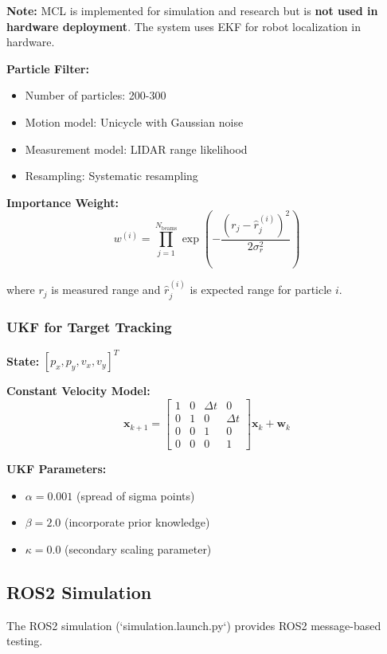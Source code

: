 \documentclass[11pt]{article}
\begin{document}
\textbf{Note:} MCL is implemented for simulation and research but is \textbf{not used in hardware deployment}. The system uses EKF for robot localization in hardware.

\textbf{Particle Filter:}
\begin{itemize}
    \item Number of particles: 200-300
    \item Motion model: Unicycle with Gaussian noise
    \item Measurement model: LIDAR range likelihood
    \item Resampling: Systematic resampling
\end{itemize}

\textbf{Importance Weight:}
\[
w^{(i)} = \prod_{j=1}^{N_{\text{beams}}} \exp\left(-\frac{(r_j - \hat{r}_j^{(i)})^2}{2\sigma_r^2}\right)
\]

where $r_j$ is measured range and $\hat{r}_j^{(i)}$ is expected range for particle $i$.

\subsubsection{UKF for Target Tracking}

\textbf{State:} $[p_x, p_y, v_x, v_y]^T$

\textbf{Constant Velocity Model:}
\[
\mathbf{x}_{k+1} = \begin{bmatrix}
1 & 0 & \Delta t & 0 \\
0 & 1 & 0 & \Delta t \\
0 & 0 & 1 & 0 \\
0 & 0 & 0 & 1
\end{bmatrix} \mathbf{x}_k + \mathbf{w}_k
\]

\textbf{UKF Parameters:}
\begin{itemize}
    \item $\alpha = 0.001$ (spread of sigma points)
    \item $\beta = 2.0$ (incorporate prior knowledge)
    \item $\kappa = 0.0$ (secondary scaling parameter)
\end{itemize}

\subsection{ROS2 Simulation}

The ROS2 simulation (`simulation.launch.py`) provides ROS2 message-based testing.
\end{document}
